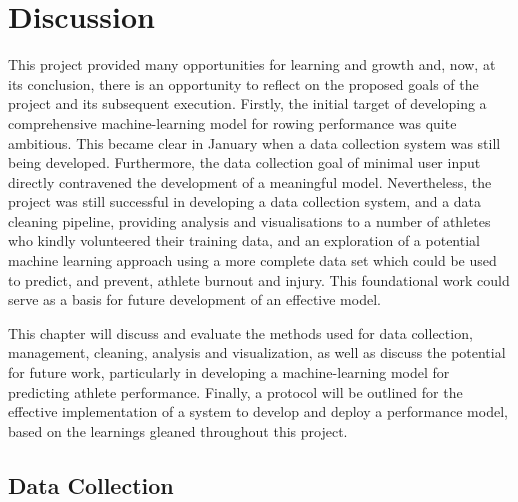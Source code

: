 \chapter{\label{chap:discussion}Discussion}
This project provided many opportunities for learning and growth and, now, at its conclusion, there is an opportunity to reflect on the proposed goals of the project and its subsequent execution. Firstly, the initial target of developing a comprehensive machine-learning model for rowing performance was quite ambitious. This became clear in January when a data collection system was still being developed. Furthermore, the data collection goal of minimal user input directly contravened the development of a meaningful model. Nevertheless, the project was still successful in developing a data collection system, and a data cleaning pipeline, providing analysis and visualisations to a number of athletes who kindly volunteered their training data, and an exploration of a potential machine learning approach using a more complete data set which could be used to predict, and prevent, athlete burnout and injury. This foundational work could serve as a basis for future development of an effective model. 

This chapter will discuss and evaluate the methods used for data collection, management, cleaning, analysis and visualization, as well as discuss the potential for future work, particularly in developing a machine-learning model for predicting athlete performance. Finally, a protocol will be outlined for the effective implementation of a system to develop and deploy a performance model, based on the learnings gleaned throughout this project.

\section{Data Collection}
